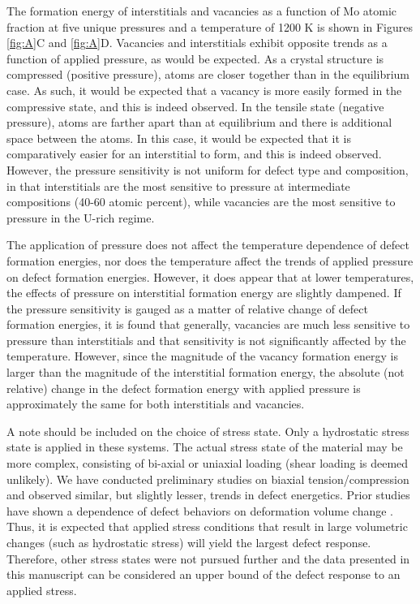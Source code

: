 \documentclass[review]{elsarticle}
\begin{document}
The formation energy of interstitials and vacancies as a function of Mo atomic fraction at five unique pressures and a temperature of 1200 K is shown in Figures \ref{fig:A}C and \ref{fig:A}D. Vacancies and interstitials exhibit opposite trends as a function of applied pressure, as would be expected. As a crystal structure is compressed (positive pressure), atoms are closer together than in the equilibrium case. As such, it would be expected that a vacancy is more easily formed in the compressive state, and this is indeed observed. In the tensile state (negative pressure), atoms are farther apart than at equilibrium and there is additional space between the atoms. In this case, it would be expected that it is comparatively easier for an interstitial to form, and this is indeed observed. However, the pressure sensitivity is not uniform for defect type and composition, in that interstitials are the most sensitive to pressure at intermediate compositions (40-60 atomic percent), while vacancies are the most sensitive to pressure in the U-rich regime. 

The application of pressure does not affect the temperature dependence of defect formation energies, nor does the temperature affect the trends of applied pressure on defect formation energies. However, it does appear that at lower temperatures, the effects of pressure on interstitial formation energy are slightly dampened. If the pressure sensitivity is gauged as a matter of relative change of defect formation energies, it is found that generally, vacancies are much less sensitive to pressure than interstitials and that sensitivity is not significantly affected by the temperature. However, since the magnitude of the vacancy formation energy is larger than the magnitude of the interstitial formation energy, the absolute (not relative) change in the defect formation energy with applied pressure is approximately the same for both interstitials and vacancies. 

A note should be included on the choice of stress state. Only a hydrostatic stress state is applied in these systems. The actual stress state of the material may be more complex, consisting of bi-axial or uniaxial loading (shear loading is deemed unlikely). We have conducted preliminary studies on biaxial tension/compression and observed similar, but slightly lesser, trends in defect energetics. Prior studies have shown a dependence of defect behaviors on deformation volume change \cite{beeler2015,beeler2016}. Thus, it is expected that applied stress conditions that result in large volumetric changes (such as hydrostatic stress) will yield the largest defect response. Therefore, other stress states were not pursued further and the data presented in this manuscript can be considered an upper bound of the defect response to an applied stress.
\end{document}
